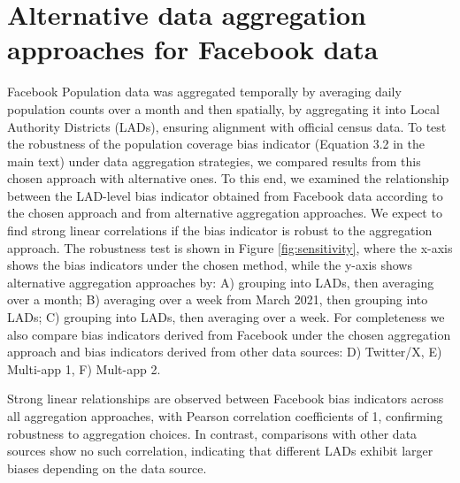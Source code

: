 \documentclass[]{rsos}%
\begin{document}
\providecommand{\EndFirstPage}{%
}

\maketitle

\newpage

\section{Alternative data aggregation approaches for Facebook data}\label{alternative-data-aggregation-approaches-for-facebook-data}

Facebook Population data was aggregated temporally by averaging daily
population counts over a month and then spatially, by aggregating it
into Local Authority Districts (LADs), ensuring alignment with official
census data. To test the robustness of the population coverage bias
indicator (Equation 3.2 in the main text) under data aggregation strategies, we compared results from this
chosen approach with alternative ones. To this end, we examined
the relationship between the LAD-level bias indicator obtained from
Facebook data according to the chosen approach and from alternative
aggregation approaches. We expect to find strong linear correlations if
the bias indicator is robust to the aggregation approach. The robustness
test is shown in Figure \ref{fig:sensitivity}, where the x-axis shows
the bias indicators under the chosen method, while the y-axis shows
alternative aggregation approaches by: A) grouping into LADs, then
averaging over a month; B) averaging over a week from March 2021, then
grouping into LADs; C) grouping into LADs, then averaging over a week.
For completeness we also compare bias indicators derived from Facebook
under the chosen aggregation approach and bias indicators derived from
other data sources: D) Twitter/X, E) Multi-app 1, F) Mult-app 2.

Strong linear relationships are observed between Facebook bias
indicators across all aggregation approaches, with Pearson correlation
coefficients of 1, confirming robustness to aggregation choices. In
contrast, comparisons with other data sources show no such correlation,
indicating that different LADs exhibit larger biases depending on the
data source.
\end{document}
